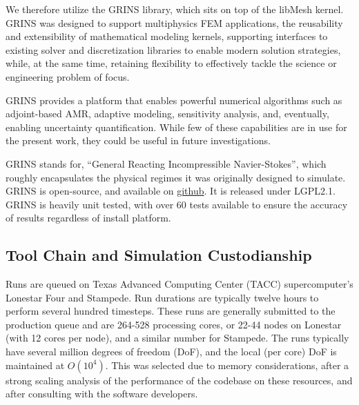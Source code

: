 We therefore utilize the GRINS library\cite{GRINSpaper}, which sits on
top of the libMesh kernel. GRINS was designed to support multiphysics FEM
applications, the reusability and extensibility of mathematical
modeling kernels, supporting interfaces to existing solver and
discretization libraries to enable modern solution strategies, while, at
the same time, retaining flexibility to effectively tackle the science
or engineering problem of focus. 

GRINS provides a platform that enables powerful numerical algorithms
such as adjoint-based AMR, adaptive modeling, sensitivity analysis,
and, eventually, enabling uncertainty quantification. While few of these
capabilities are in use for the present work, they could be useful in
future investigations. 

GRINS stands for, ``General Reacting Incompressible Navier-Stokes'',
which roughly encapsulates the physical regimes it was originally
designed to simulate. GRINS is open-source, and available on
\hyperref[www.github.com/grinsfem/grins]{github}. It is released 
under LGPL2.1.  GRINS is heavily unit tested, with over 60 tests
available to ensure the accuracy of results regardless of install platform.






\subsection{Tool Chain and Simulation Custodianship}

Runs are queued on Texas Advanced Computing Center (TACC)
supercomputer's Lonestar Four and Stampede. Run durations are typically  
twelve hours to perform several hundred timesteps. 
These runs are generally submitted to the production queue and are  
264-528 processing cores, 
or 22-44 nodes on Lonestar (with 12 cores per node), and a similar number
for Stampede. The runs typically have several million degrees of freedom (DoF), 
and the local (per core) DoF is maintained at $O(10^4)$. This was
selected due to memory considerations, after a strong scaling
analysis of the performance of the codebase on these resources, and
after consulting with the software developers.  

